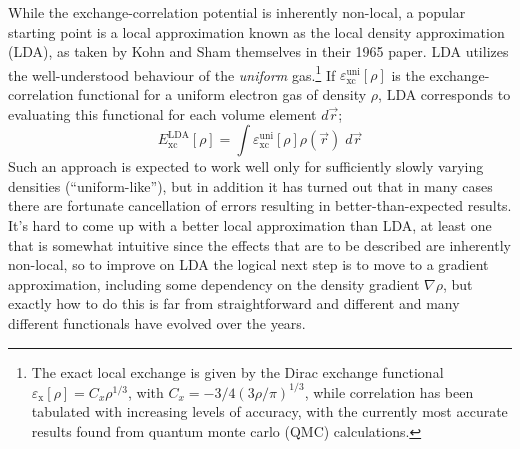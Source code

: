 \documentclass[11pt,bibliography=totoc,index=totoc]{scrbook}   %
\newcommand{\comment}[1]{\hl{#1}}
\begin{document}
While the exchange-correlation potential is inherently non-local, a popular starting point is a local approximation known as the local density approximation (LDA),
as taken by Kohn and Sham themselves in their 1965 paper.\cite{KohnSham:1965}
LDA utilizes the well-understood behaviour of the \emph{uniform} gas.\footnote{
    The exact local exchange is given by the Dirac exchange functional $\varepsilon_{\text{x}}[\rho]=C_x \rho^{1/3}$, with $C_x=-3/4(3\rho/\pi)^{1/3}$,\cite{Dirac:1930}\cite[108]{Parr:1994} 
while correlation has been tabulated with increasing levels of accuracy, with the currently most accurate results found from quantum monte carlo (QMC) calculations.\cite[p. 109 and references 297-299 within]{Martin:2004} 
}
If $\varepsilon_{\text{xc}}^{\text{uni}}[\rho]$ is the exchange-correlation functional for a uniform electron gas of density $\rho$,
LDA corresponds to evaluating this functional for each volume element $d\vec{r}$;
\begin{equation}
    E_{\text{xc}}^{\text{LDA}}[\rho] = \int \varepsilon_{\text{xc}}^{\text{uni}}[\rho] \rho(\vec{r}) \;d\vec{r}
  \label{eq:lda}
\end{equation}
Such an approach is expected to work well only for sufficiently slowly varying densities (``uniform-like''), 
but in addition it has turned out that in many cases there are fortunate cancellation of errors resulting in better-than-expected results.\cite{Gunnarson:1976}\cite[529]{Kantorovich:2004}\cite[180]{Parr:1994}
It's hard to come up with a better local approximation than LDA, at least one that is somewhat intuitive 
since the effects that are to be described are inherently non-local, so 
to improve on LDA the logical next step is to move to a gradient approximation, including some dependency on the density gradient $\nabla\rho$, but exactly how to do this is far from straightforward and different and many different functionals have evolved over the years. 
\end{document}

